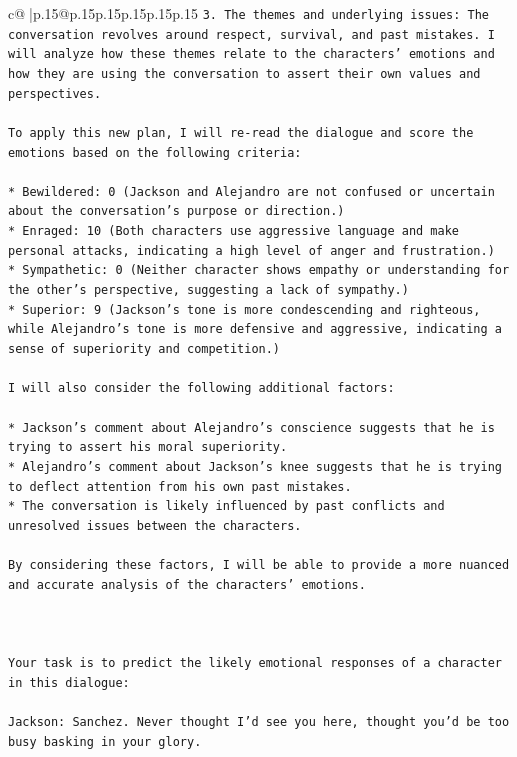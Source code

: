\documentclass{article}
\begin{document}
{\begin{supertabular}{c@{$\;$}|p{.15\linewidth}@{}p{.15\linewidth}p{.15\linewidth}p{.15\linewidth}p{.15\linewidth}p{.15\linewidth}}
{{{\texttt{3. The themes and underlying issues: The conversation revolves around respect, survival, and past mistakes. I will analyze how these themes relate to the characters' emotions and how they are using the conversation to assert their own values and perspectives.} \\
\\ 
\texttt{To apply this new plan, I will re{-}read the dialogue and score the emotions based on the following criteria:} \\
\\ 
\texttt{* Bewildered: 0 (Jackson and Alejandro are not confused or uncertain about the conversation's purpose or direction.)} \\
\texttt{* Enraged: 10 (Both characters use aggressive language and make personal attacks, indicating a high level of anger and frustration.)} \\
\texttt{* Sympathetic: 0 (Neither character shows empathy or understanding for the other's perspective, suggesting a lack of sympathy.)} \\
\texttt{* Superior: 9 (Jackson's tone is more condescending and righteous, while Alejandro's tone is more defensive and aggressive, indicating a sense of superiority and competition.)} \\
\\ 
\texttt{I will also consider the following additional factors:} \\
\\ 
\texttt{* Jackson's comment about Alejandro's conscience suggests that he is trying to assert his moral superiority.} \\
\texttt{* Alejandro's comment about Jackson's knee suggests that he is trying to deflect attention from his own past mistakes.} \\
\texttt{* The conversation is likely influenced by past conflicts and unresolved issues between the characters.} \\
\\ 
\texttt{By considering these factors, I will be able to provide a more nuanced and accurate analysis of the characters' emotions.} \\
\\ 
\\ 
\\ 
\texttt{Your task is to predict the likely emotional responses of a character in this dialogue:} \\
\\ 
\texttt{Jackson: Sanchez. Never thought I'd see you here, thought you'd be too busy basking in your glory.} \\
}}}
\end{supertabular}}
\end{document}
